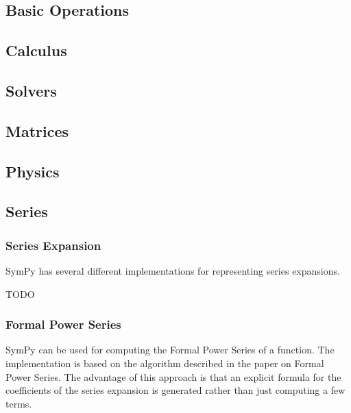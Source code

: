 
\subsection{Basic Operations}

\subsection{Calculus}

\subsection{Solvers}

\subsection{Matrices}

\subsection{Physics}

\subsection{Series}

\subsubsection{Series Expansion}

SymPy has several different implementations for representing series expansions.

TODO

\subsubsection{Formal Power Series}

SymPy can be used for computing the Formal Power Series of a function.
The implementation is based on the algorithm described in the paper on Formal Power Series\cite{Gruntz93formalpower}.
The advantage of this approach is that an explicit formula for the coefficients
of the series expansion is generated rather than just computing a few terms.

